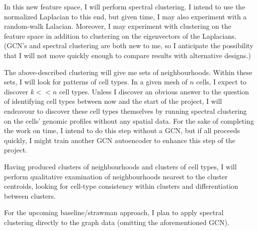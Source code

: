 \documentclass{article}
\begin{document}
In this new feature space, I will perform spectral clustering. I intend to use the normalized Laplacian to this end, but given time, I may also experiment with a random-walk Lalacian. Moreover, I may experiment with clustering on the feature space in addition to clustering on the eigenvectors of the Laplacians. (GCN's and spectral clustering are both new to me, so I anticipate the possibility that I will not move quickly enough to compare results with alternative designs.)

The above-described clustering will give me sets of neighbourhoods. Within these sets, I will look for patterns of cell types. In a given mesh of $n$ cells, I expect to discover $k << n$ cell types. Unless I discover an obvious answer to the question of identifying cell types between now and the start of the project, I will endeavour to discover these cell types themselves by running spectral clustering on the cells' genomic profiles without any spatial data. For the sake of completing the work on time, I intend to do this step without a GCN, but if all proceeds quickly, I might train another GCN autoencoder to enhance this step of the project.

Having produced clusters of neighbourhoods and clusters of cell types, I will perform qualitative examination of neighbourhoods nearest to the cluster centroids, looking for cell-type consistency within clusters and differentiation between clusters.

For the upcoming baseline/strawman approach, I plan to apply spectral clustering directly to the graph data (omitting the aforementioned GCN).
\end{document}
